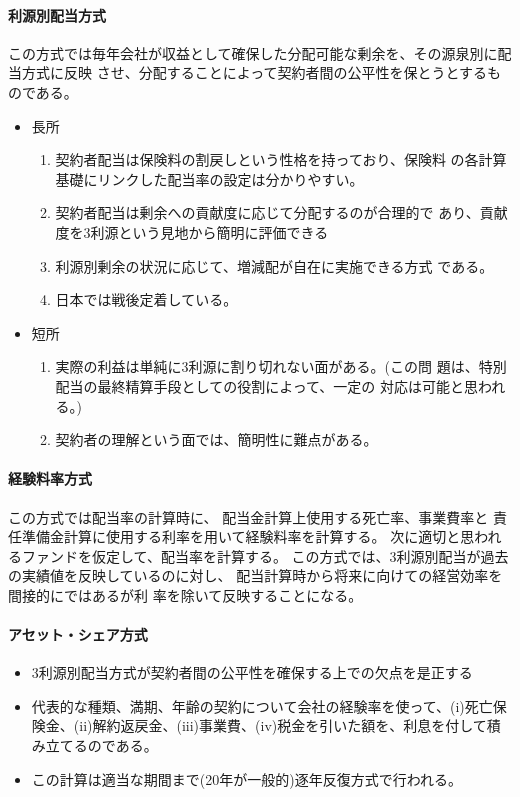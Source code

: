 \documentclass[report,gutter=10mm,fore-edge=10mm,uplatex,dvipdfmx]{jlreq}
\begin{document}
\paragraph{利源別配当方式}

この方式では毎年会社が収益として確保した分配可能な剰余を、その源泉別に配当方式に反映
させ、分配することによって契約者間の公平性を保とうとするものである。
\begin{itemize}
 \item 長所
\begin{enumerate}[i]
 \item 契約者配当は保険料の割戻しという性格を持っており、保険料
の各計算基礎にリンクした配当率の設定は分かりやすい。
 \item 契約者配当は剰余への貢献度に応じて分配するのが合理的で
あり、貢献度を3利源という見地から簡明に評価できる
 \item 利源別剰余の状況に応じて、増減配が自在に実施できる方式
である。
 \item 日本では戦後定着している。
\end{enumerate}
 \item 短所
\begin{enumerate}
 \item 実際の利益は単純に3利源に割り切れない面がある。(この問
題は、特別配当の最終精算手段としての役割によって、一定の
対応は可能と思われる。)
 \item 契約者の理解という面では、簡明性に難点がある。
\end{enumerate}
\end{itemize}

\paragraph{経験料率方式}
この方式では配当率の計算時に、
配当金計算上使用する死亡率、事業費率と
責任準備金計算に使用する利率を用いて経験料率を計算する。
次に適切と思われるファンドを仮定して、配当率を計算する。
この方式では、3利源別配当が過去の実績値を反映しているのに対し、
配当計算時から将来に向けての経営効率を間接的にではあるが利
率を除いて反映することになる。

\paragraph{アセット・シェア方式}

\begin{itemize}
 \item 3利源別配当方式が契約者間の公平性を確保する上での欠点を是正する
 \item 代表的な種類、満期、年齢の契約について会社の経験率を使って、(i)死亡保険金、(ii)解約返戻金、(iii)事業費、(iv)税金を引いた額を、利息を付して積み立てるのである。
 \item この計算は適当な期間まで(20年が一般的)逐年反復方式で行われる。
\end{itemize}
\end{document}
